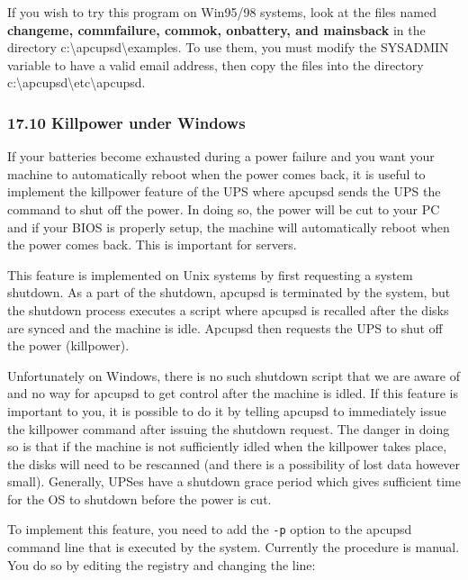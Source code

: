 If you wish to try this program on Win95/98 systems, look at the files named
{\bf changeme, commfailure, commok, onbattery, and mainsback} in the directory
c:\textbackslash{}apcupsd\textbackslash{}examples. To use them, you must
modify the SYSADMIN variable to have a valid email address, then copy the
files into the directory
c:\textbackslash{}apcupsd\textbackslash{}etc\textbackslash{}apcupsd. 

\label{Killpower-under-Windows}

\subsubsection*{17.10 Killpower under Windows}

\label{index-Windows_002c-Killpower-183}
If your batteries become exhausted during a power failure and you want your
machine to automatically reboot when the power comes back, it is useful to
implement the killpower feature of the UPS where apcupsd sends the UPS the
command to shut off the power.  In doing so, the power will be cut to your PC
and if your BIOS is properly setup, the machine will automatically reboot when
the power comes back. This is important for servers.  

This feature is implemented on Unix systems by first requesting a system
shutdown. As a part of the shutdown, apcupsd is terminated by the system, but
the shutdown process executes a script where apcupsd is recalled after the
disks are synced and the machine is idle. Apcupsd then requests the UPS to
shut off the power (killpower).  

Unfortunately on Windows, there is no such shutdown script that we are aware
of and no way for apcupsd to get control after the machine is idled. If this
feature is important to you, it is possible to do it by telling apcupsd to
immediately issue the killpower command after issuing the shutdown request.
The danger in doing so is that if the machine is not sufficiently idled when
the killpower takes place, the disks will need to be rescanned (and there is a
possibility of lost data however small). Generally, UPSes have a shutdown
grace period which gives sufficient time for the OS to shutdown before the
power is cut.  

To implement this feature, you need to add the {\tt -p} option to the apcupsd
command line that is executed by the system.  Currently the procedure is
manual. You do so by editing the registry and changing the line: 


